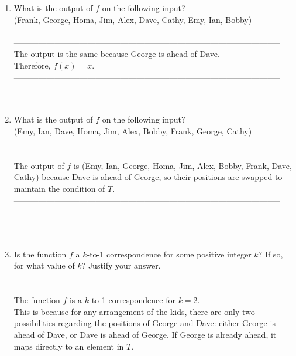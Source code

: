 \documentclass{amsart}
\theoremstyle{definition}
\theoremstyle{Exercise}
\theoremstyle{remark}
\theoremstyle{rule}
\numberwithin{equation}{section}
\begin{document}
\begin{enumerate}[label=(\alph*)]
  \item What is the output of $f$ on the following input?\\
  (Frank, George, Homa, Jim, Alex, Dave, Cathy, Emy, Ian, Bobby)\\\\
--------------------------------------------------------------------------------------------------\\
The output is the same because George is ahead of Dave.\\ Therefore, $f(x) = x$.\\
--------------------------------------------------------------------------------------------------\\
\\\\
  \item What is the output of $f$ on the following input?\\
(Emy, Ian, Dave, Homa, Jim, Alex, Bobby, Frank, George, Cathy)\\\\
--------------------------------------------------------------------------------------------------\\
The output of $f$ is (Emy, Ian, George, Homa, Jim, Alex, Bobby, Frank, Dave, Cathy) because Dave is ahead of George, so their positions are swapped to maintain the condition of $T$.\\
--------------------------------------------------------------------------------------------------\\
\\\\\
  \item Is the function $f$ a $k$-to-1 correspondence for some positive integer $k$? If so, for what value of $k$? Justify your answer.\\\\
--------------------------------------------------------------------------------------------------\\
The function $f$ is a $k$-to-1 correspondence for $k = 2$.\\
This is because for any arrangement of the kids, there are only two possibilities regarding the positions of George and Dave: either George is ahead of Dave, or Dave is ahead of George. If George is already ahead, it maps directly to an element in $T$.\\

\end{enumerate}
\end{document}
